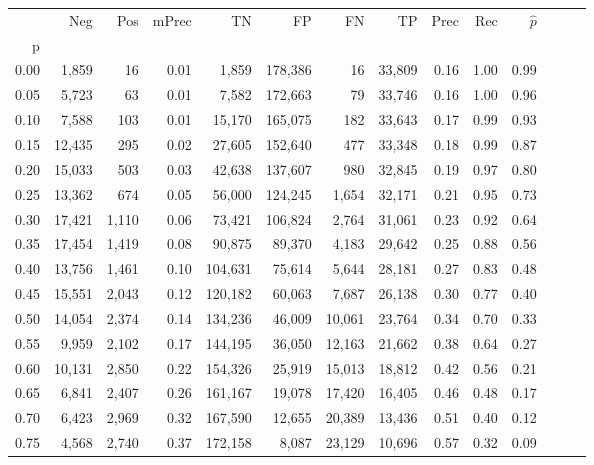 \begin{tabular}{rrrrrrrrrrrrrr}
\toprule
{} &     Neg &    Pos & mPrec &       TN &       FP &      FN &      TP &  Prec &   Rec & $\hat{p}$ \\
p    &         &        &       &          &          &         &         &       &       &           \\
\midrule
0.00 &   1,859 &     16 &  0.01 &    1,859 &  178,386 &      16 &  33,809 &  0.16 &  1.00 &      0.99 \\
0.05 &   5,723 &     63 &  0.01 &    7,582 &  172,663 &      79 &  33,746 &  0.16 &  1.00 &      0.96 \\
0.10 &   7,588 &    103 &  0.01 &   15,170 &  165,075 &     182 &  33,643 &  0.17 &  0.99 &      0.93 \\
0.15 &  12,435 &    295 &  0.02 &   27,605 &  152,640 &     477 &  33,348 &  0.18 &  0.99 &      0.87 \\
0.20 &  15,033 &    503 &  0.03 &   42,638 &  137,607 &     980 &  32,845 &  0.19 &  0.97 &      0.80 \\
0.25 &  13,362 &    674 &  0.05 &   56,000 &  124,245 &   1,654 &  32,171 &  0.21 &  0.95 &      0.73 \\
0.30 &  17,421 &  1,110 &  0.06 &   73,421 &  106,824 &   2,764 &  31,061 &  0.23 &  0.92 &      0.64 \\
0.35 &  17,454 &  1,419 &  0.08 &   90,875 &   89,370 &   4,183 &  29,642 &  0.25 &  0.88 &      0.56 \\
0.40 &  13,756 &  1,461 &  0.10 &  104,631 &   75,614 &   5,644 &  28,181 &  0.27 &  0.83 &      0.48 \\
0.45 &  15,551 &  2,043 &  0.12 &  120,182 &   60,063 &   7,687 &  26,138 &  0.30 &  0.77 &      0.40 \\
0.50 &  14,054 &  2,374 &  0.14 &  134,236 &   46,009 &  10,061 &  23,764 &  0.34 &  0.70 &      0.33 \\
0.55 &   9,959 &  2,102 &  0.17 &  144,195 &   36,050 &  12,163 &  21,662 &  0.38 &  0.64 &      0.27 \\
0.60 &  10,131 &  2,850 &  0.22 &  154,326 &   25,919 &  15,013 &  18,812 &  0.42 &  0.56 &      0.21 \\
0.65 &   6,841 &  2,407 &  0.26 &  161,167 &   19,078 &  17,420 &  16,405 &  0.46 &  0.48 &      0.17 \\
0.70 &   6,423 &  2,969 &  0.32 &  167,590 &   12,655 &  20,389 &  13,436 &  0.51 &  0.40 &      0.12 \\
0.75 &   4,568 &  2,740 &  0.37 &  172,158 &    8,087 &  23,129 &  10,696 &  0.57 &  0.32 &      0.09 \\

\end{tabular}
